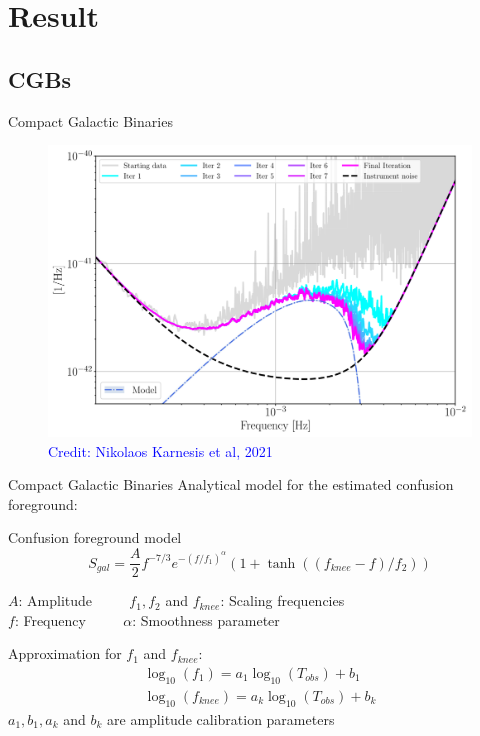 \documentclass[pdf]{beamer}
\newcommand{\credit}[1]{\tiny{\textcolor{blue}{Credit: #1}}}
\begin{document}
\section{Result}
\subsection{CGBs}
\begin{frame}{Compact Galactic Binaries}
\begin{figure}
\includegraphics[scale=.22]{fig/MainPSD.png}
\caption*{\credit{Nikolaos Karnesis et al, 2021}}
\end{figure}
\end{frame}


\begin{frame}{Compact Galactic Binaries}
Analytical model for the estimated confusion foreground:
\begin{block}{Confusion foreground model}
\begin{equation*}
S_{gal}  = \dfrac{A}{2} f^{-7/3} e^{-(f/f_1)^\alpha} (1+\tanh((f_{knee}-f)/f_2))
\end{equation*}
\end{block}
$A$: Amplitude $\qquad$ $f_1, f_2$ and $f_{knee}$: Scaling frequencies \\
$f$: Frequency $\qquad$ $\alpha$: Smoothness parameter 

Approximation for $f_1$ and $f_{knee}$:
\begin{align*}
\log_{10}(f_1) = a_1 \log_{10}(T_{obs}) +b_1\\
\log_{10}(f_{knee}) = a_k \log_{10}(T_{obs}) + b_k 
\end{align*}
$a_1, b_1, a_k$ and $b_k$ are amplitude calibration parameters
\end{frame}
\end{document}
